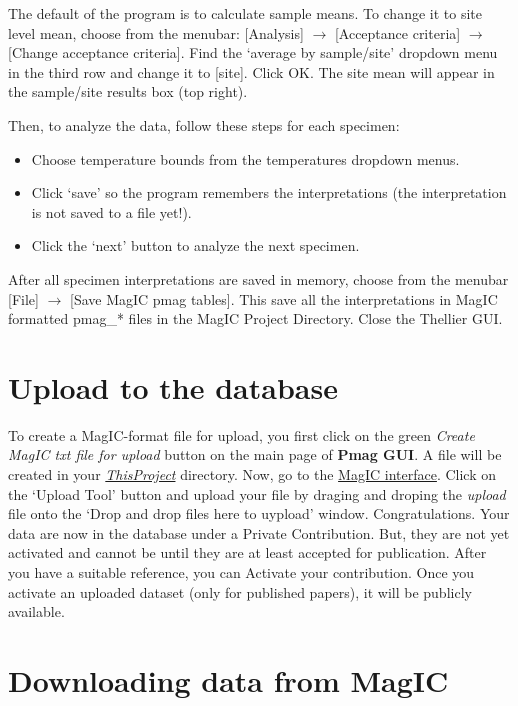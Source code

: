 \documentclass[11pt]{book}
\begin{document}
{The default of the program is to calculate sample means. To change it to site level mean, choose from the menubar: [Analysis] $\rightarrow$ [Acceptance criteria] $\rightarrow$  [Change acceptance criteria]. Find the `average by sample/site' dropdown menu in the third row and change it to [site]. Click OK. The site mean will appear in the sample/site results box (top right).

Then, to analyze the data, follow these steps for each specimen:
 \begin{itemize}
 \item Choose temperature bounds from the temperatures dropdown menus.
 \item Click ‘save’ so the program remembers the interpretations (the interpretation is not saved to a file yet!).
 \item  Click the ‘next’ button to analyze the next specimen.
   \end{itemize}
After all specimen interpretations are saved in memory, choose from the menubar [File] $\rightarrow$ [Save MagIC pmag tables]. This save all the interpretations in MagIC formatted pmag\_* files in the MagIC Project Directory.
Close the Thellier GUI.



\section{Upload to the database }

To create a MagIC-format file for upload, you first click on the green {\it Create MagIC txt file for upload} button on the main page of {\bf Pmag GUI}. A file will be created in your \href{#Project_Directory}{\it ThisProject} directory.  Now, go to the  \href{http://earthref.org/MAGIC/}{MagIC  interface}.      Click on the `Upload Tool' button and upload your file by  draging and droping the {\it upload}   file onto the  `Drop and drop files here to uypload' window.
Congratulations. Your data are now in the database under a Private Contribution.  But, they are not yet activated and cannot be until they are at least accepted for publication.  After you have a suitable reference, you can Activate your contribution.  Once you activate an uploaded dataset (only for published papers), it will be publicly available.


\section{Downloading data from {\bf MagIC}}

}
\end{document}
